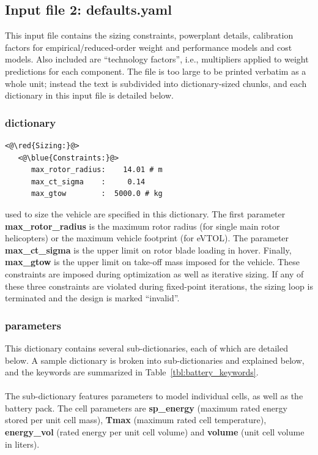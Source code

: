 \subsection*{Input file 2: defaults.yaml}
This input file contains the sizing constraints, powerplant details, calibration factors for empirical/reduced-order weight and performance models and cost models. Also included are ``technology factors'', i.e., multipliers applied to weight predictions for each component. The file is too large to be printed verbatim as a whole unit; instead the text is subdivided into dictionary-sized chunks, and each dictionary in this input file is detailed below.

\subsubsection{ dictionary}
\begin{lstlisting}
<@\red{Sizing:}@>
   <@\blue{Constraints:}@>
      max_rotor_radius:    14.01 # m
      max_ct_sigma    :     0.14
      max_gtow        :  5000.0 # kg
\end{lstlisting}

 used to size the vehicle are specified in this dictionary. The first parameter \textbf{max\_rotor\_radius} is the maximum rotor radius (for single main rotor helicopters) or the maximum vehicle footprint (for eVTOL). The parameter \textbf{max\_ct\_sigma} is the upper limit on rotor blade loading in hover. Finally, \textbf{max\_gtow} is the upper limit on take-off mass imposed for the vehicle. These constraints are imposed during optimization as well as iterative sizing. If any of these three constraints are violated during fixed-point iterations, the sizing loop is terminated and the design is marked ``invalid''.

\subsubsection{ parameters}
This dictionary contains several sub-dictionaries, each of which are detailed below. A sample dictionary is broken into sub-dictionaries and explained below, and the keywords are summarized in Table~\ref{tbl:battery_keywords}.

\paragraph{}
The  sub-dictionary features parameters to model individual cells, as well as the battery pack. The cell parameters are \textbf{sp\_energy} (maximum rated energy stored per unit cell mass), \textbf{Tmax} (maximum rated cell temperature), \textbf{energy\_vol} (rated energy per unit cell volume) and \textbf{volume} (unit cell volume in liters).

